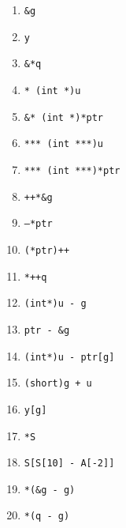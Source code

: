 \documentclass[12pt]{article}
\begin{document}
\newpage

\begin{enumerate}
\item \texttt{\&g}
\item \texttt{y}
\item \texttt{\&*q}
\item \texttt{* (int *)u}
\item \texttt{\&* (int *)*ptr}
\item \texttt{*** (int ***)u}
\item \texttt{*** (int ***)*ptr}
\item \texttt{++*\&g}
\item \texttt{--*ptr}
\item \texttt{(*ptr)++}
\item \texttt{*++q}
\item \texttt{(int*)u - g}
\item \texttt{ptr - \&g}
\item \texttt{(int*)u - ptr[g]}
\item \texttt{(short)g + u}
\item \texttt{y[g]}
\item \texttt{*S}
\item \texttt{S[S[10] - A[-2]]}
\item \texttt{*(\&g - g)}
\item \texttt{*(q - g)}


\end{enumerate}
\newpage
\end{document}
